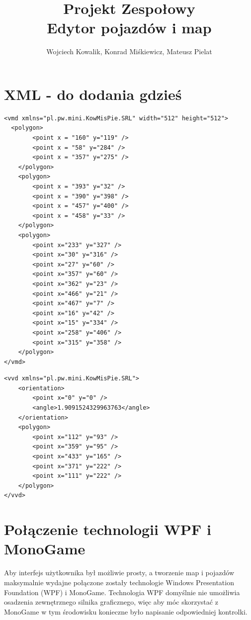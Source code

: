 \documentclass{article}
\let\oldsection\section
\renewcommand\section{\clearpage\oldsection} %
\begin{document}
\title{\textbf{Projekt Zespołowy}\\Edytor pojazdów i map}
\author{Wojciech Kowalik, Konrad Miśkiewicz, Mateusz Pielat}
\maketitle


\section{XML - do dodania gdzieś}

\begin{lstlisting}
<vmd xmlns="pl.pw.mini.KowMisPie.SRL" width="512" height="512">
  <polygon>
        <point x = "160" y="119" />
        <point x = "58" y="284" />
        <point x = "357" y="275" />
    </polygon>
    <polygon>
        <point x = "393" y="32" />
        <point x = "390" y="398" />
        <point x = "457" y="400" />
        <point x = "458" y="33" />
    </polygon>
    <polygon>
        <point x="233" y="327" />
        <point x="30" y="316" />
        <point x="27" y="60" />
        <point x="357" y="60" />
        <point x="362" y="23" />
        <point x="466" y="21" />
        <point x="467" y="7" />
        <point x="16" y="42" />
        <point x="15" y="334" />
        <point x="258" y="406" />
        <point x="315" y="358" />
    </polygon>
</vmd>
\end{lstlisting}

\begin{lstlisting}
<vvd xmlns="pl.pw.mini.KowMisPie.SRL">
    <orientation>
        <point x="0" y="0" />
        <angle>1.9091524329963763</angle>
    </orientation>
    <polygon>
        <point x="112" y="93" />
        <point x="359" y="95" />
        <point x="433" y="165" />
        <point x="371" y="222" />
        <point x="111" y="222" />
    </polygon>
</vvd>
\end{lstlisting}

\section{Połączenie technologii WPF i MonoGame}

Aby interfejs użytkownika był możliwie prosty, a tworzenie map i pojazdów maksymalnie wydajne połączone zostały technologie Windows Presentation Foundation (WPF) i MonoGame. Technologia WPF domyślnie nie umożliwia osadzenia zewnętrznego silnika graficznego, więc aby móc skorzystać z MonoGame w tym środowisku konieczne było napisanie odpowiedniej kontrolki. 
\end{document}
